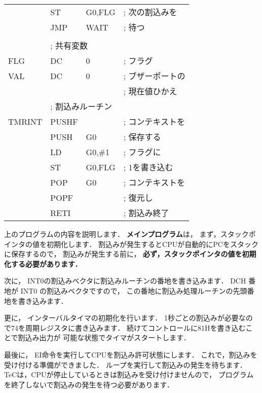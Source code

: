 \begin{center}
{\begin{tabular}{|l|l l l|}
      & ST    & G0,FLG            & ; 次の割込みを   \\
      & JMP   & WAIT              & ;   待つ         \\
      &       &                   &                  \\
      & \multicolumn{3}{|l|}{; 共有変数}             \\
FLG   & DC    & 0                 & ; フラグ         \\
VAL   & DC    & 0                 & ; ブザーポートの \\
      &       &                   & ;   現在値ひかえ \\
      & \multicolumn{3}{|l|}{; 割込みルーチン}       \\
TMRINT& PUSHF &                   & ; コンテキストを \\
      & PUSH  & G0                & ;   保存する     \\
      & LD    & G0,\#1            & ; フラグに       \\
      & ST    & G0,FLG            & ;   1を書き込む  \\
      & POP   & G0                & ; コンテキストを \\
      & POPF  &                   & ;   復元し       \\
      & RETI  &                   & ; 割込み終了     \\
\hline
\end{tabular}
}
\end{center}


上のプログラムの内容を説明します．
{\bf メインプログラム}は，
まず，スタックポインタの値を初期化します．
割込みが発生するとCPUが自動的にPCをスタックに保存するので，
割込みが発生する前に，
{\bf 必ず，スタックポインタの値を初期化する必要があります．}

次に，
INT0の割込みベクタに割込みルーチンの番地を書き込みます．
DCH 番地が INT0 の割込みベクタですので，
この番地に割込み処理ルーチンの先頭番地を書き込みます．

更に，
インターバルタイマの初期化を行います．
1秒ごとの割込みが必要なので74を周期レジスタに書き込みます．
続けてコントロールに81Hを書き込むことで割込み出力が
可能な状態でタイマがスタートします．

最後に，
EI命令を実行してCPUを割込み許可状態にします．
これで，割込みを受け付ける準備ができました．
ループを実行して割込みの発生を待ちます．
TeCは，CPUが停止しているときは割込みを受け付けませんので，
プログラムを終了しないで割込みの発生を待つ必要があります．

